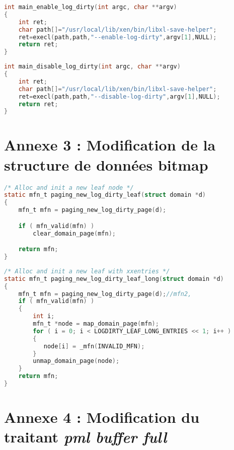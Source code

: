 \begin{lstlisting}[language=C, caption=xl enable-log-dirty, label={lst:enable_logdirty}]
int main_enable_log_dirty(int argc, char **argv)
{
    int ret;
    char path[]="/usr/local/lib/xen/bin/libxl-save-helper";
    ret=execl(path,path,"--enable-log-dirty",argv[1],NULL); 
    return ret;
}
\end{lstlisting}

\begin{lstlisting}[language=C, caption=xl disable-log-dirty, label={lst:disable_logdirty}]
int main_disable_log_dirty(int argc, char **argv)
{
    int ret;
    char path[]="/usr/local/lib/xen/bin/libxl-save-helper";
    ret=execl(path,path,"--disable-log-dirty",argv[1],NULL);
    return ret;
}
\end{lstlisting}

\section{Annexe 3 : Modification de la structure de données bitmap}
\label{section:bitmap}

\begin{lstlisting}[language=C, caption=Méthode appelée générer une feuille L1 avant modification de la bitmap, label={lst:leaf_bit}]
/* Alloc and init a new leaf node */
static mfn_t paging_new_log_dirty_leaf(struct domain *d)
{
    mfn_t mfn = paging_new_log_dirty_page(d);

    if ( mfn_valid(mfn) )
        clear_domain_page(mfn);

    return mfn;
}
\end{lstlisting}

\begin{lstlisting}[language=C, caption=Méthode appelée pour générer un noeud L1 après modification de la bitmap, label={lst:leaf_UL}]
/* Alloc and init a new leaf with xxentries */
static mfn_t paging_new_log_dirty_leaf_long(struct domain *d)
{    
    mfn_t mfn = paging_new_log_dirty_page(d);//mfn2, 
    if ( mfn_valid(mfn) )
    {
        int i;
        mfn_t *node = map_domain_page(mfn);
        for ( i = 0; i < LOGDIRTY_LEAF_LONG_ENTRIES << 1; i++ )
        {
           node[i] = _mfn(INVALID_MFN);       
        }       
        unmap_domain_page(node);
    }  
    return mfn;
}
\end{lstlisting}

\section{Annexe 4 : Modification du traitant \textit{pml buffer full}}
\label{section:pml_buffer_full}


